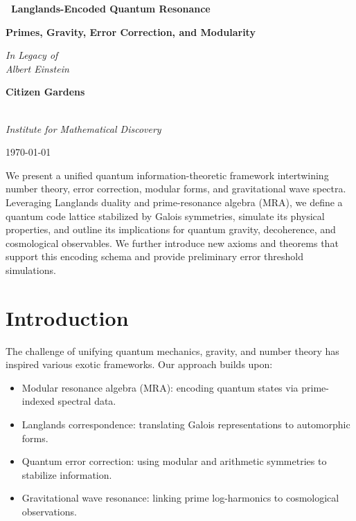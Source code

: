 \documentclass[12]{amsart}
\theoremstyle{plain}
\begin{document}
\begin{titlepage}
    \centering

    \vspace*{2cm}

    {\Huge\bfseries\ Langlands-Encoded Quantum Resonance 
 \par}
    \vspace{0.5cm}
    {\LARGE\bfseries Primes, Gravity, Error Correction, and Modularity \par}

    \vspace{2cm}
    \Huge{\textit{In Legacy of 
    \\  
    Albert Einstein}} \\
    \vspace{1cm}
     {\bfseries Citizen Gardens 
     \par}
     \\
    \textit{Institute for Mathematical Discovery} 
     \vspace{1cm}\\
    {\normalsize \today \par}

    \vfill

   
    \vspace{0.5em}
    \begin{minipage}{0.85\textwidth}
        \small
        We present a unified quantum information-theoretic framework intertwining number theory, error correction, modular forms, and gravitational wave spectra. Leveraging Langlands duality and prime-resonance algebra (MRA), we define a quantum code lattice stabilized by Galois symmetries, simulate its physical properties, and outline its implications for quantum gravity, decoherence, and cosmological observables. We further introduce new axioms and theorems that support this encoding schema and provide preliminary error threshold simulations.


    \end{minipage}

\end{titlepage}


\clearpage
\clearpage

\section{Introduction}
The challenge of unifying quantum mechanics, gravity, and number theory has inspired various exotic frameworks. Our approach builds upon:
\begin{itemize}
    \item Modular resonance algebra (MRA): encoding quantum states via prime-indexed spectral data.
    \item Langlands correspondence: translating Galois representations to automorphic forms.
    \item Quantum error correction: using modular and arithmetic symmetries to stabilize information.
    \item Gravitational wave resonance: linking prime log-harmonics to cosmological observations.
\end{itemize}
\end{document}
